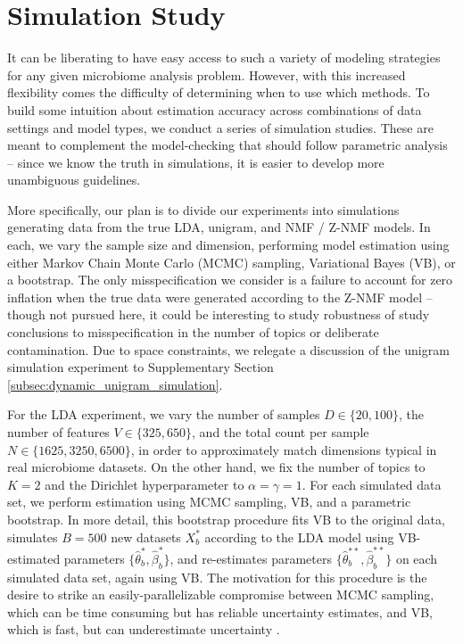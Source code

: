 \documentclass[oupdraft]{bio}
\begin{document}
\section{Simulation Study}

It can be liberating to have easy access to such a variety of modeling
strategies for any given microbiome analysis problem. However, with this
increased flexibility comes the difficulty of determining when to use which
methods. To build some intuition about estimation accuracy across combinations
of data settings and model types, we conduct a series of simulation studies.
These are meant to complement the model-checking that should follow parametric
analysis -- since we know the truth in simulations, it is easier to develop more
unambiguous guidelines.

More specifically, our plan is to divide our experiments into simulations
generating data from the true LDA, unigram, and NMF / Z-NMF models. In each, we
vary the sample size and dimension, performing model estimation using either
Markov Chain Monte Carlo (MCMC) sampling, Variational Bayes (VB), or a
bootstrap. The only misspecification we consider is a failure to account for
zero inflation when the true data were generated according to the Z-NMF model --
though not pursued here, it could be interesting to study robustness of study
conclusions to misspecification in the number of topics or deliberate
contamination. Due to space constraints, we relegate a discussion of the unigram
simulation experiment to Supplementary Section
\ref{subsec:dynamic_unigram_simulation}.

For the LDA experiment, we vary the number of samples $D \in \{20, 100\}$, the
number of features $V \in \{325, 650\}$, and the total count per sample $N \in
\{1625, 3250, 6500\}$, in order to approximately match dimensions typical in
real microbiome datasets. On the other hand, we fix the number of topics to $K =
2$ and the Dirichlet hyperparameter to $\alpha = \gamma = 1$. For each simulated
data set, we perform estimation using MCMC sampling, VB, and a parametric
bootstrap. In more detail, this bootstrap procedure fits VB to the original
data, simulates $B = 500$ new datasets $X^{\ast}_{b}$ according to the LDA model
using VB-estimated parameters $\{\hat{\theta}^{\ast}_{b},
\hat{\beta}^{\ast}_{b}\}$, and re-estimates parameters
$\{\hat{\theta}^{\ast\ast}_{b}, \hat{\beta}^{\ast\ast}_{b}\}$ on each simulated
data set, again using VB. The motivation for this procedure is the desire to
strike an easily-parallelizable compromise between MCMC sampling, which can be
time consuming but has reliable uncertainty estimates, and VB, which is fast,
but can underestimate uncertainty \citep{wang2005inadequacy}.
\end{document}
